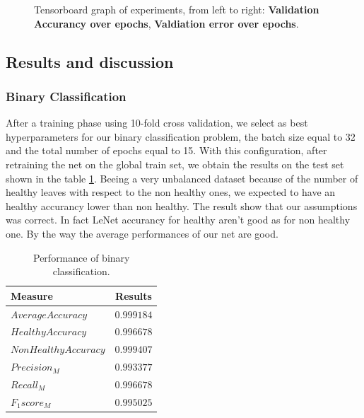 \begin{figure}
\begin{center}
	\begin{center}
		\caption{Tensorboard graph of experiments, from left to right: \textbf{Validation Accurancy over epochs}, \textbf{Valdiation error over epochs}. }
		\label{fig:tensorboard}
	\end{center}
	\vspace{-15pt}
\end{center}
\end{figure}

\subsection{Results and discussion}
\subsubsection{Binary Classification}
After a training phase using 10-fold cross validation, we select as best hyperparameters for our binary classification problem, the batch size equal to 32 and the total number of epochs equal to 15. With this configuration, after retraining the net on the global train set, we obtain the results on the test set shown in the table \ref{table:binary}. Beeing a very unbalanced dataset because of the number of healthy leaves with respect to the non healthy ones, we expected to have an healthy accurancy lower than non healthy. The result show that our assumptions was correct. In fact LeNet accurancy for healthy aren't good as for non healthy one. By the way the average performances of our net are good.
\begin{table}[H]
	\begin{center}
		\begin{tabular}{|l|c|}
			\hline
			\textbf{Measure} & \textbf{Results} \\ 
			\hline
			$Average Accuracy$ & $0.999184$ \\
			$Healthy Accuracy$ & $0.996678$ \\
			$Non Healthy Accuracy$ & $0.999407$ \\
			$Precision_M$ & $0.993377$ \\
			$Recall_M$ & $0.996678$ \\
			$F_1 score_M$ & $0.995025$ \\
			\hline
		\end{tabular}
	\end{center}
	\caption{Performance of binary classification.}
	\label{table:binary}
\end{table}
